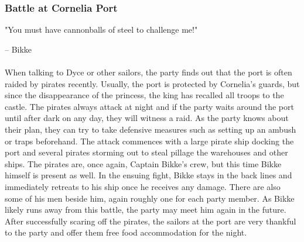 \subsubsection*{Battle at Cornelia Port}  
"You must have cannonballs of steel to challenge me!"

-- Bikke \\\\
When talking to Dyce or other sailors, the party finds out that the port is often raided by pirates recently.
Usually, the port is protected by Cornelia's guards, but since the disappearance of the princess, the king has recalled all troops to the castle.
The pirates always attack at night and if the party waits around the port until after dark on any day, they will witness a raid.
As the party knows about their plan, they can try to take defensive measures such as setting up an ambush or traps beforehand.
The attack commences with a large pirate ship docking the port and several pirates storming out to steal pillage the warehouses and other ships.
The pirates are, once again, Captain Bikke's crew, but this time Bikke himself is present as well.
In the ensuing fight, Bikke stays in the back lines and immediately retreats to his ship once he receives any damage. 
There are also some of his men beside him, again roughly one for each party member.
As Bikke likely runs away from this battle, the party may meet him again in the future.
After successfully scaring off the pirates, the sailors at the port are very thankful to the party and offer them free food accommodation for the night.
\vfill


\clearpage